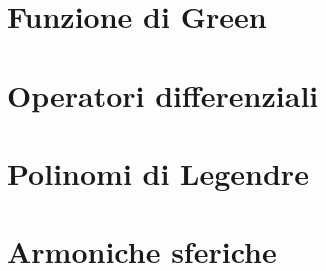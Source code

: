 \documentclass[landscape, 12pt, a4paper]{article}
\begin{document}
\begin{multicols}{3}

%

%

\section{Funzione di Green}


\section{Operatori differenziali}


\section{Polinomi di Legendre}


\section{Armoniche sferiche}


\end{multicols}
\end{document}
